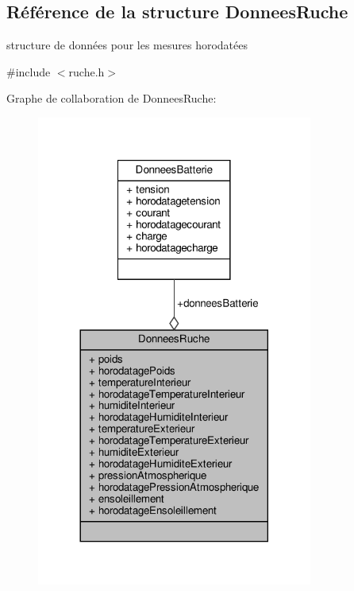 \hypertarget{struct_donnees_ruche}{}\subsection{Référence de la structure Donnees\+Ruche}
\label{struct_donnees_ruche}


structure de données pour les mesures horodatées  




{\ttfamily \#include $<$ruche.\+h$>$}



Graphe de collaboration de Donnees\+Ruche\+:\nopagebreak
\begin{figure}[H]
\begin{center}
\leavevmode
\includegraphics[width=257pt]{struct_donnees_ruche__coll__graph}
\end{center}
\end{figure}
